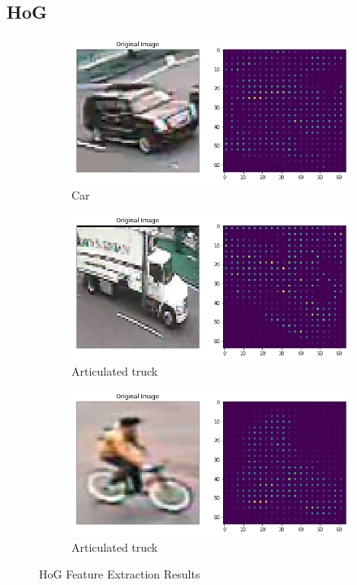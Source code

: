 \documentclass[12pt]{article}
\begin{document}
\begin{appendices} 


\section{HoG}

\label{appendix:HoG}

\begin{figure}[!htb]
    \centering
    \begin{subfigure}[t]{\textwidth}
        \centering
        \includegraphics[width=.7\linewidth]{HoG/Car.png} 
        \caption{Car} \label{fig:HoG_car}
    \end{subfigure}
    \begin{subfigure}[t]{.7\textwidth}
        \centering
        \includegraphics[width=\linewidth]{HoG/Articulated_truck.png} 
        \caption{Articulated truck} 
        \label{fig:HoG_truck}
    \end{subfigure}
    \begin{subfigure}[t]{\textwidth}
        \centering
        \includegraphics[width=.7\linewidth]{HoG/Pedastrian.png}
        \caption{Articulated truck} 
        \label{fig:HoG_Pedastrian}
    \end{subfigure}
    \caption{HoG Feature Extraction Results}
\end{figure}

\end{appendices}
\end{document}
